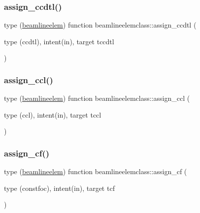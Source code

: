 \mbox{\label{namespacebeamlineelemclass_a729afda498a0fcdb5c6625258a745a94}} 
\subsubsection{\texorpdfstring{assign\_ccdtl()}{assign\_ccdtl()}}
{\footnotesize\ttfamily type (\mbox{\hyperlink{namespacebeamlineelemclass_structbeamlineelemclass_1_1beamlineelem}{beamlineelem}}) function beamlineelemclass\+::assign\+\_\+ccdtl (\begin{DoxyParamCaption}\item[{type (ccdtl), intent(in), target}]{tccdtl }\end{DoxyParamCaption})}

\mbox{\label{namespacebeamlineelemclass_ac9b767ca614ed15fb347d385e982ef0d}} 
\subsubsection{\texorpdfstring{assign\_ccl()}{assign\_ccl()}}
{\footnotesize\ttfamily type (\mbox{\hyperlink{namespacebeamlineelemclass_structbeamlineelemclass_1_1beamlineelem}{beamlineelem}}) function beamlineelemclass\+::assign\+\_\+ccl (\begin{DoxyParamCaption}\item[{type (ccl), intent(in), target}]{tccl }\end{DoxyParamCaption})}

\mbox{\label{namespacebeamlineelemclass_ab5db1ddb5dbca2a72ab8efde22f2f90d}} 
\subsubsection{\texorpdfstring{assign\_cf()}{assign\_cf()}}
{\footnotesize\ttfamily type (\mbox{\hyperlink{namespacebeamlineelemclass_structbeamlineelemclass_1_1beamlineelem}{beamlineelem}}) function beamlineelemclass\+::assign\+\_\+cf (\begin{DoxyParamCaption}\item[{type (constfoc), intent(in), target}]{tcf }\end{DoxyParamCaption})}

